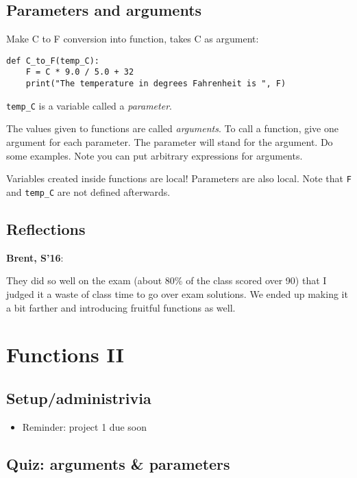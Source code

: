 \documentclass{article}
\newenvironment{reflect}[1]
{
  \noindent
  \begin{lrbox}{\reflectbox}
    \begin{minipage}[t]{\textwidth}
      \textbf{#1}:
}{
    \end{minipage}
  \end{lrbox}
  \fbox{\usebox{\reflectbox}}
}
\begin{document}
\subsection*{Parameters and arguments}

Make C to F conversion into function, takes C as argument:
\begin{verbatim}
def C_to_F(temp_C):
    F = C * 9.0 / 5.0 + 32
    print("The temperature in degrees Fahrenheit is ", F)
\end{verbatim}

\verb|temp_C| is a variable called a \emph{parameter}.

The values given to functions are called \emph{arguments}.  To call a
function, give one argument for each parameter.  The parameter will
stand for the argument.  Do some examples.  Note you can put arbitrary
expressions for arguments.

Variables created inside functions are local!  Parameters are also
local. Note that \verb|F| and \verb|temp_C| are not defined afterwards.

\subsection*{Reflections}

\begin{reflect}{Brent, S'16}
  They did so well on the exam (about 80\% of the class scored over
  90) that I judged it a waste of class time to go over exam
  solutions.  We ended up making it a bit farther and introducing
  fruitful functions as well.
\end{reflect}

\newpage
\section{Functions II}

\subsection*{Setup/administrivia}
\begin{itemize}
\item Reminder: project 1 due soon
\end{itemize}

\subsection*{Quiz: arguments \& parameters}
\end{document}
